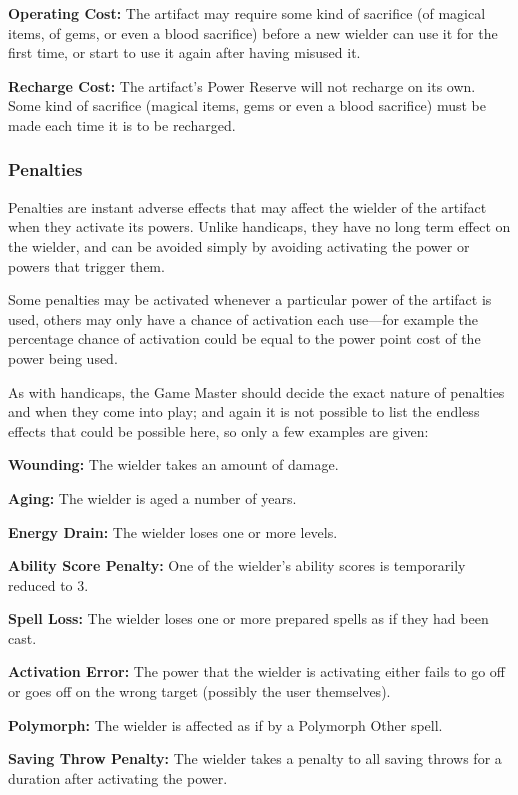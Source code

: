\begin{multicols*}{2}
\textbf{Operating Cost:} The artifact may require some kind of sacrifice (of magical items, of gems, or even a blood sacrifice) before a new wielder can use it for the first time, or start to use it again after having misused it.

\textbf{Recharge Cost:} The artifact’s Power Reserve will not recharge on its own. Some kind of sacrifice (magical items, gems or even a blood sacrifice) must be made each time it is to be recharged.

\subsubsection{Penalties}
Penalties are instant adverse effects that may affect the wielder of the artifact when they activate its powers. Unlike handicaps, they have no long term effect on the wielder, and can be avoided simply by avoiding activating the power or powers that trigger them.

Some penalties may be activated whenever a particular power of the artifact is used, others may only have a chance of activation each use—for example the percentage chance of activation could be equal to the power point cost of the power being used.

As with handicaps, the Game Master should decide the exact nature of penalties and when they come into play; and again it is not possible to list the endless effects that could be possible here, so only a few examples are given:

\textbf{Wounding:} The wielder takes an amount of damage.

\textbf{Aging:} The wielder is aged a number of years.

\textbf{Energy Drain:} The wielder loses one or more levels.

\textbf{Ability Score Penalty:} One of the wielder’s ability scores is temporarily reduced to 3.

\textbf{Spell Loss:} The wielder loses one or more prepared spells as if they had been cast.

\textbf{Activation Error:} The power that the wielder is activating either fails to go off or goes off on the wrong target (possibly the user themselves).

\textbf{Polymorph:} The wielder is affected as if by a Polymorph Other spell.

\textbf{Saving Throw Penalty:} The wielder takes a penalty to all saving throws for a duration after activating the power.

\end{multicols*}
